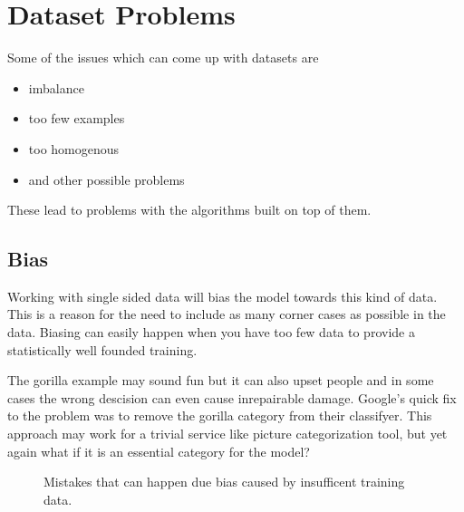 \documentclass[letterpaper,10pt,english]{sphinxmanual}
\begin{document}
\chapter{Dataset Problems}
\label{\detokenize{03-Datasets:dataset-problems}}
\sphinxAtStartPar
Some of the issues which can come up with datasets are
\begin{itemize}
\item {} 
\sphinxAtStartPar
imbalance

\item {} 
\sphinxAtStartPar
too few examples

\item {} 
\sphinxAtStartPar
too homogenous

\item {} 
\sphinxAtStartPar
and other possible problems

\end{itemize}

\sphinxAtStartPar
These lead to problems with the algorithms built on top of them.


\section{Bias}
\label{\detokenize{03-Datasets:bias}}
\sphinxAtStartPar
Working with single sided data will bias the model towards this kind of data. This is a reason for the need to include as many corner cases as possible in the data. Biasing can easily happen when you have too few data to provide a statistically well founded training.

\sphinxAtStartPar
The gorilla example may sound fun but it can also upset people and in some cases the wrong descision can even cause inrepairable damage. Google’s quick fix to the problem was to remove the gorilla category from their classifyer. This approach may work for a trivial service like picture categorization tool, but yet again what if it is an essential category for the model?

\begin{figure}[htbp]
\centering
\capstart

\noindent{}
\caption{Mistakes that can happen due bias caused by insufficent training data.}\label{\detokenize{03-Datasets:id18}}\end{figure}





\sphinxAtStartPar
{}
\end{document}

